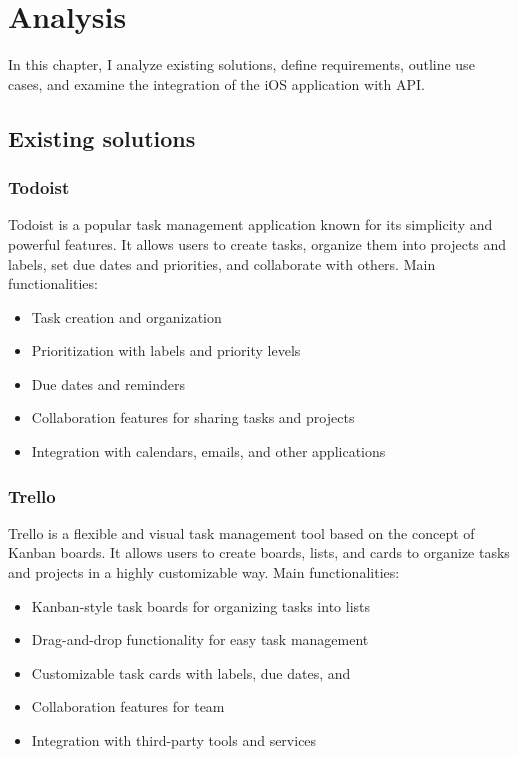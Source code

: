\documentclass[
  biblatex = false,
  language=english,
  figures=false,
  sourcecodes,
  glossaries,
  index
]{kidiplom}
\begin{document}
\section{Analysis}
In this chapter, I analyze existing solutions, define requirements, outline use cases, and examine the integration of the iOS application with API.

\subsection{Existing solutions}
\subsubsection{Todoist}
Todoist is a popular task management application known for its simplicity and powerful features. It allows users to create tasks, organize them into projects and labels, set due dates and priorities, and collaborate with others. Main functionalities:
\begin{itemize}
	\item Task creation and organization
	\item Prioritization with labels and priority levels
	\item Due dates and reminders
	\item Collaboration features for sharing tasks and projects
	\item Integration with calendars, emails, and other applications
\end{itemize}

\subsubsection{Trello}
Trello is a flexible and visual task management tool based on the concept of Kanban boards. It allows users to create boards, lists, and cards to organize tasks and projects in a highly customizable way. Main functionalities:
\begin{itemize}
	\item Kanban-style task boards for organizing tasks into lists
	\item Drag-and-drop functionality for easy task management
	\item Customizable task cards with labels, due dates, and 
	\item Collaboration features for team 
	\item Integration with third-party tools and services
 \end{itemize}
\end{document}

